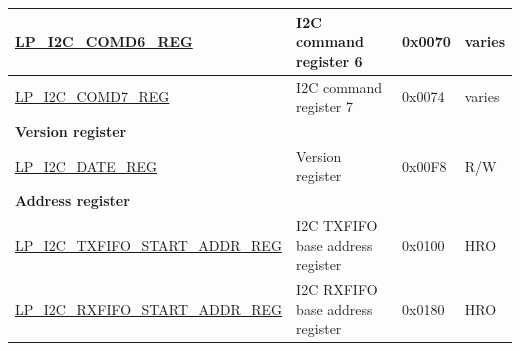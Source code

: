 \begin{longtable}{ | p{6cm} | p{7.2cm} | p{1.3cm} | p{1cm} | }
\hyperref[regdesc:LPI2CCOMD6REG]{LP\_I2C\_COMD6\_REG} & I2C command register 6 & 0x0070 & varies \\ \hline
\hyperref[regdesc:LPI2CCOMD7REG]{LP\_I2C\_COMD7\_REG} & I2C command register 7 & 0x0074 & varies \\ \hline
\multicolumn{4}{|l|}{\textbf{Version register}} \\ \hline
\hyperref[regdesc:LPI2CDATEREG]{LP\_I2C\_DATE\_REG} & Version register & 0x00F8 & R/W \\ \hline
\multicolumn{4}{|l|}{\textbf{Address register}} \\ \hline
\hyperref[regdesc:LPI2CTXFIFOSTARTADDRREG]{LP\_I2C\_TXFIFO\_START\_ADDR\_REG} & I2C TXFIFO base address register & 0x0100 & HRO \\ \hline
\hyperref[regdesc:LPI2CRXFIFOSTARTADDRREG]{LP\_I2C\_RXFIFO\_START\_ADDR\_REG} & I2C RXFIFO base address register & 0x0180 & HRO \\ \hline
\end{longtable}

